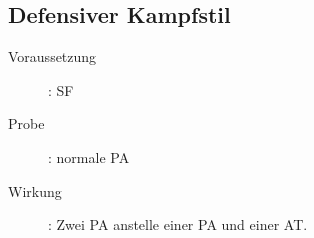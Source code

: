 \subsection{Defensiver Kampfstil}
\label{reaktion.defensiver_kampfstil}
\begin{description}
    \item[Voraussetzung]:
        SF 
    \item[Probe]:
        normale PA
    \item[Wirkung]:
        Zwei PA anstelle einer PA und einer AT.
\end{description}
